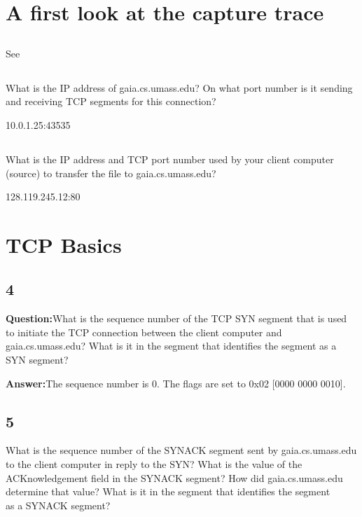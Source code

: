 \documentclass[12pt]{article}
\begin{document}
\maketitle

\section{A first look at the capture trace}

\subsection{}
See 

\subsection{}
What is the IP address of gaia.cs.umass.edu? On what port number is it sending 
and receiving TCP segments for this connection?

10.0.1.25:43535

\tiny

\normalsize

\subsection{}
What is the IP address and TCP port number used by your client computer 
(source) to transfer the file to gaia.cs.umass.edu?

128.119.245.12:80

\section{TCP Basics}
\subsection{4}
\textbf{Question:}What is the sequence number of the TCP SYN segment that is used to initiate the
TCP connection between the client computer and gaia.cs.umass.edu? What is it
in the segment that identifies the segment as a SYN segment?

\textbf{Answer:}The sequence number is 0. The flags are set to 0x02 [0000 0000 0010].

\subsection{5}
What is the sequence number of the SYNACK segment sent by gaia.cs.umass.edu
to the client computer in reply to the SYN? What is the value of the
ACKnowledgement field in the SYNACK segment? How did gaia.cs.umass.edu
determine that value? What is it in the segment that identifies the segment \\
as a SYNACK segment?
\end{document}
